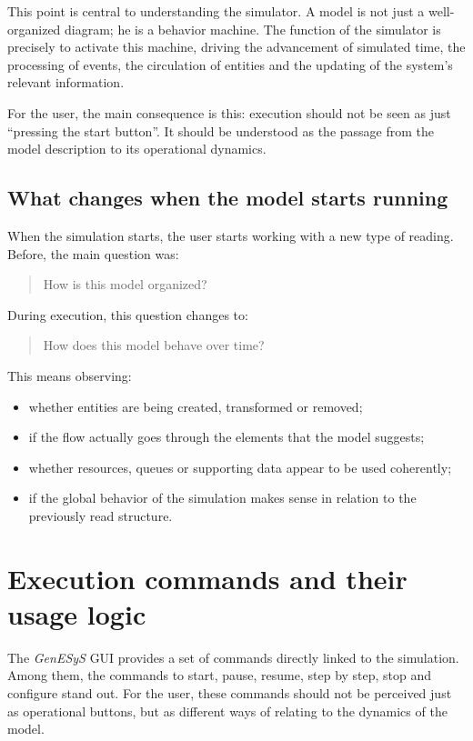 This point is central to understanding the simulator. A model is not just a well-organized diagram; he is a behavior machine. The function of the simulator is precisely to activate this machine, driving the advancement of simulated time, the processing of events, the circulation of entities and the updating of the system's relevant information.

For the user, the main consequence is this: execution should not be seen as just \enquote{pressing the start button}. It should be understood as the passage from the model description to its operational dynamics.

\subsection{What changes when the model starts running}
\label{subsec:cap5_o_que_muda_quando_executa}

When the simulation starts, the user starts working with a new type of reading. Before, the main question was:
\begin{quote}
How is this model organized?
\end{quote}

During execution, this question changes to:
\begin{quote}
How does this model behave over time?
\end{quote}

This means observing:
\begin{itemize}
\item whether entities are being created, transformed or removed;
\item if the flow actually goes through the elements that the model suggests;
\item whether resources, queues or supporting data appear to be used coherently;
\item if the global behavior of the simulation makes sense in relation to the previously read structure.
\end{itemize}

\section{Execution commands and their usage logic}
\label{sec:cap5_comandos_execucao_logica}

The \textit{GenESyS} GUI provides a set of commands directly linked to the simulation. Among them, the commands to start, pause, resume, step by step, stop and configure stand out. For the user, these commands should not be perceived just as operational buttons, but as different ways of relating to the dynamics of the model.

